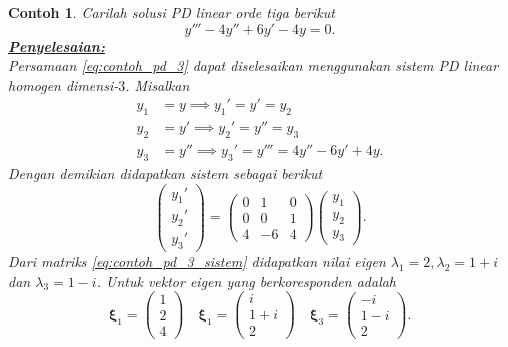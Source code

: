 \documentclass[a4paper]{article}
\theoremstyle{definisi}
\newtheorem{contoh}{Contoh}[subsection]
\newcommand{\bfxi}{\boldsymbol{\xi}}
\newcommand{\solusi}{\textbf{\underline{Penyelesaian:}}\\}
\numberwithin{equation}{section}
\begin{document}
  \begin{contoh}
    Carilah solusi PD linear orde tiga berikut
    \begin{equation}\label{eq:contoh_pd_3}
      y''' - 4y'' + 6y' - 4y = 0.
    \end{equation}
    \solusi
    Persamaan \eqref{eq:contoh_pd_3} dapat diselesaikan menggunakan sistem PD linear homogen dimensi-$3$. Misalkan
    \begin{align*}
      y_1 &= y \implies y_1' = y' = y_2\\
      y_2 &= y' \implies y_2' = y'' = y_3\\
      y_3 &= y''\implies y_3' = y''' = 4y'' - 6y' + 4y.
    \end{align*}
    Dengan demikian didapatkan sistem sebagai berikut
    \begin{equation}\label{eq:contoh_pd_3_sistem}
      \begin{pmatrix}
        y_1'\\
        y_2'\\
        y_3'
      \end{pmatrix} = \begin{pmatrix}
        0 & 1 & 0\\
        0 & 0 & 1\\
        4 & -6 & 4
      \end{pmatrix}\begin{pmatrix}
        y_1\\
        y_2\\
        y_3
      \end{pmatrix}.
    \end{equation}
    Dari matriks \eqref{eq:contoh_pd_3_sistem} didapatkan nilai eigen $\lambda_1 = 2, \lambda_2 = 1+i$ dan $\lambda_3 = 1-i$. Untuk vektor eigen yang berkoresponden adalah
    \[\bfxi_1 = \begin{pmatrix}1\\2\\4\end{pmatrix} \quad \bfxi_1 = \begin{pmatrix}i\\1+i\\2\end{pmatrix} \quad \bfxi_3 = \begin{pmatrix}-i\\1-i\\2\end{pmatrix}.\]
    \begin{enumerate}[label=Langkah \arabic*: ,leftmargin=*]

\end{enumerate}
\end{contoh}
\end{document}
